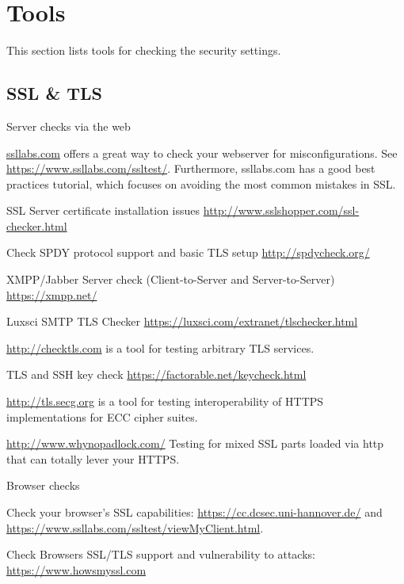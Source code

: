 \chapter{Tools}
\label{cha:tools}
This section lists tools for checking the security settings.

\section{SSL \& TLS}

Server checks via the web
\begin{itemize*}
  \item \href{http://ssllabs.com}{ssllabs.com} offers a great way to check your webserver for misconfigurations. See \url{https://www.ssllabs.com/ssltest/}. Furthermore, ssllabs.com has a good best practices tutorial, which focuses on avoiding the most common mistakes in SSL.
  \item SSL Server certificate installation issues \url{http://www.sslshopper.com/ssl-checker.html}
  \item Check SPDY protocol support and basic TLS setup \url{http://spdycheck.org/}
  \item XMPP/Jabber Server check (Client-to-Server and Server-to-Server) \url{https://xmpp.net/}
  \item Luxsci SMTP TLS Checker \url{https://luxsci.com/extranet/tlschecker.html}
  \item \url{http://checktls.com} is a tool for testing arbitrary TLS services.
  \item TLS and SSH key check \url{https://factorable.net/keycheck.html}
  \item \url{http://tls.secg.org} is a tool for testing interoperability of HTTPS implementations for ECC cipher suites.
  \item \url{http://www.whynopadlock.com/} Testing for mixed SSL parts loaded via http that can totally lever your HTTPS.
\end{itemize*}

Browser checks
\begin{itemize*}
  \item Check your browser's SSL capabilities: \url{https://cc.dcsec.uni-hannover.de/} and \url{https://www.ssllabs.com/ssltest/viewMyClient.html}.
  \item Check Browsers SSL/TLS support and vulnerability to attacks: \url{https://www.howsmyssl.com}
\end{itemize*}


